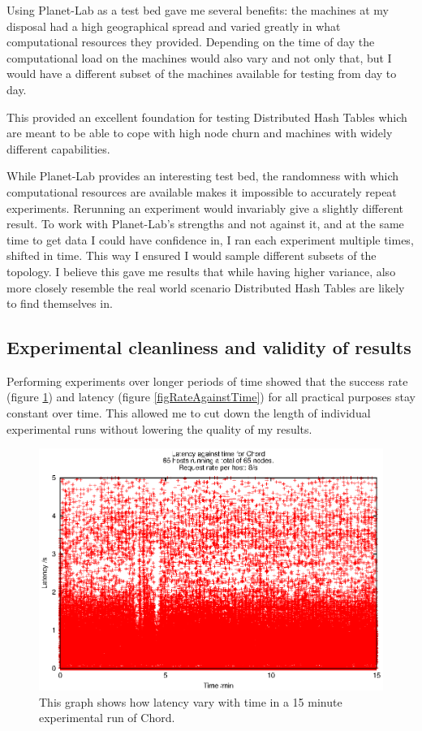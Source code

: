 Using Planet-Lab as a test bed gave me several benefits: the machines at my disposal had a high geographical spread and varied greatly in what computational resources they provided. Depending on the time of day the computational load on the machines would also vary and not only that, but I would have a different subset of the machines available for testing from day to day.

This provided an excellent foundation for testing Distributed Hash Tables which are meant to be able to cope with high node churn and machines with widely different capabilities.

While Planet-Lab provides an interesting test bed, the randomness with which computational resources are available makes it impossible to accurately repeat experiments. Rerunning an experiment would invariably give a slightly different result.
To work with Planet-Lab's strengths and not against it, and at the same time to get data I could have confidence in, I ran each experiment multiple times, shifted in time. This way I ensured I would sample different subsets of the topology. I believe this gave me results that while having higher variance, also more closely resemble the real world scenario Distributed Hash Tables are likely to find themselves in.

\subsection{Experimental cleanliness and validity of results}
Performing experiments over longer periods of time showed that the success rate (figure \ref{figLatencyAgainstTime}) and latency (figure \ref{figRateAgainstTime}) for all practical purposes stay constant over time. This allowed me to cut down the length of individual experimental runs without lowering the quality of my results.

\begin{figure}[!h]
  \begin{center}
    \includegraphics[width=0.9\linewidth]{illustrations/latency_aginst_time_chord.eps}
    \caption{This graph shows how latency vary with time in a 15 minute experimental run of Chord.}
    \label{figLatencyAgainstTime}
  \end{center}
\end{figure}

